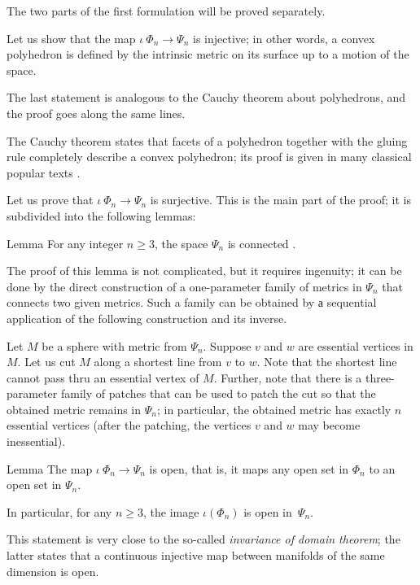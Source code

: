 \documentclass[oneside,a4paper]{article}
\begin{document}
\medskip

The two parts of the first formulation will be proved separately.

 Let us show that the map $\iota\:\Phi_n\to\Psi_n$ is injective;
in other words, a convex polyhedron is defined by the intrinsic metric on its surface up to a motion of the space.

The last statement is analogous to the Cauchy theorem about polyhedrons,
and the proof goes along the same lines. 

The Cauchy theorem states that facets of a polyhedron together with the gluing rule completely describe a convex polyhedron;
its proof is given in many classical popular texts \cite{aigner-zigler,dolbilin,tabacnikov-fuks}.

\medskip

Let us prove that $\iota\:\Phi_n\to\Psi_n$ is surjective.
This is the main part of the proof;
it is subdivided into the following lemmas:

\begin{thm}{Lemma}
For any integer $n\ge 3$, the space $\Psi_n$ is connected .
\end{thm}

The proof of this lemma is not complicated, but it requires ingenuity;
it can be done by the direct construction of a one-parameter family of metrics in $\Psi_n$ that connects two given metrics.
Such a family can be obtained by а sequential application of the following construction and its inverse.

Let $M$ be a sphere with metric from $\Psi_n$.
Suppose $v$ and $w$ are essential vertices in $M$.
Let us cut $M$ along a shortest line from $v$ to $w$.
Note that the shortest line cannot pass thru an essential vertex of $M$.
Further, note that there is a three-parameter family of patches that can be used to patch the cut so that the obtained metric remains in $\Psi_n$;
in particular, the obtained metric has exactly $n$ essential vertices (after the patching, the vertices $v$ and $w$ may become inessential).


\begin{thm}{Lemma}
The map $\iota\:\Phi_n\to\Psi_n$ is open, 
that is, it maps any open set in $\Phi_n$ to an open set in $\Psi_n$.

In particular, for any $n\ge 3$, the image $\iota(\Phi_n)$ is open in~$\Psi_n$.
\end{thm}

This statement is very close to the so-called \emph{invariance of domain theorem};
the latter states that a continuous injective map between manifolds of the same dimension is open.
\end{document}

